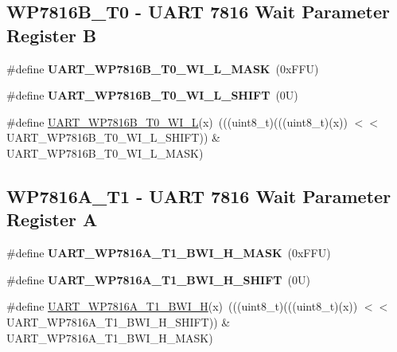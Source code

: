 \subsection*{W\+P7816\+B\+\_\+\+T0 -\/ U\+A\+RT 7816 Wait Parameter Register B}
\begin{DoxyCompactItemize}
\item 
\mbox{\label{group___u_a_r_t___register___masks_gabc56ff29bf4c0086406e9071162b9b2b}} 
\#define {\bfseries U\+A\+R\+T\+\_\+\+W\+P7816\+B\+\_\+\+T0\+\_\+\+W\+I\+\_\+\+L\+\_\+\+M\+A\+SK}~(0x\+F\+F\+U)
\item 
\mbox{\label{group___u_a_r_t___register___masks_gacc1d29d1d78d039ebbc1ec05563f5d35}} 
\#define {\bfseries U\+A\+R\+T\+\_\+\+W\+P7816\+B\+\_\+\+T0\+\_\+\+W\+I\+\_\+\+L\+\_\+\+S\+H\+I\+FT}~(0\+U)
\item 
\#define \mbox{\hyperlink{group___u_a_r_t___register___masks_ga24121de4ed246d82e431c8a3d030e0ec}{U\+A\+R\+T\+\_\+\+W\+P7816\+B\+\_\+\+T0\+\_\+\+W\+I\+\_\+L}}(x)~(((uint8\+\_\+t)(((uint8\+\_\+t)(x)) $<$$<$ U\+A\+R\+T\+\_\+\+W\+P7816\+B\+\_\+\+T0\+\_\+\+W\+I\+\_\+\+L\+\_\+\+S\+H\+I\+FT)) \& U\+A\+R\+T\+\_\+\+W\+P7816\+B\+\_\+\+T0\+\_\+\+W\+I\+\_\+\+L\+\_\+\+M\+A\+SK)
\end{DoxyCompactItemize}
\subsection*{W\+P7816\+A\+\_\+\+T1 -\/ U\+A\+RT 7816 Wait Parameter Register A}
\begin{DoxyCompactItemize}
\item 
\mbox{\label{group___u_a_r_t___register___masks_ga7dcda8a32e529eff87d31db1a87d0594}} 
\#define {\bfseries U\+A\+R\+T\+\_\+\+W\+P7816\+A\+\_\+\+T1\+\_\+\+B\+W\+I\+\_\+\+H\+\_\+\+M\+A\+SK}~(0x\+F\+F\+U)
\item 
\mbox{\label{group___u_a_r_t___register___masks_ga972fd0381a0870dd9e2da858a5b6b028}} 
\#define {\bfseries U\+A\+R\+T\+\_\+\+W\+P7816\+A\+\_\+\+T1\+\_\+\+B\+W\+I\+\_\+\+H\+\_\+\+S\+H\+I\+FT}~(0\+U)
\item 
\#define \mbox{\hyperlink{group___u_a_r_t___register___masks_ga8dc80e4a4bc9204991479a41218bbaad}{U\+A\+R\+T\+\_\+\+W\+P7816\+A\+\_\+\+T1\+\_\+\+B\+W\+I\+\_\+H}}(x)~(((uint8\+\_\+t)(((uint8\+\_\+t)(x)) $<$$<$ U\+A\+R\+T\+\_\+\+W\+P7816\+A\+\_\+\+T1\+\_\+\+B\+W\+I\+\_\+\+H\+\_\+\+S\+H\+I\+FT)) \& U\+A\+R\+T\+\_\+\+W\+P7816\+A\+\_\+\+T1\+\_\+\+B\+W\+I\+\_\+\+H\+\_\+\+M\+A\+SK)
\end{DoxyCompactItemize}
